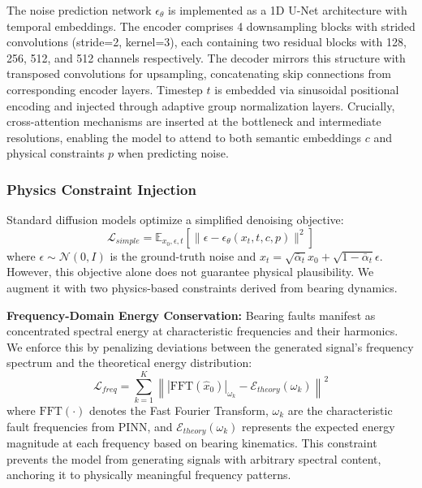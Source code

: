 \documentclass[journal]{IEEEtran}
\begin{document}
The noise prediction network $\epsilon_\theta$ is implemented as a 1D U-Net architecture with temporal embeddings. The encoder comprises 4 downsampling blocks with strided convolutions (stride=2, kernel=3), each containing two residual blocks with 128, 256, 512, and 512 channels respectively. The decoder mirrors this structure with transposed convolutions for upsampling, concatenating skip connections from corresponding encoder layers. Timestep $t$ is embedded via sinusoidal positional encoding and injected through adaptive group normalization layers. Crucially, cross-attention mechanisms are inserted at the bottleneck and intermediate resolutions, enabling the model to attend to both semantic embeddings $c$ and physical constraints $p$ when predicting noise.

\subsubsection{Physics Constraint Injection}
Standard diffusion models optimize a simplified denoising objective:
\begin{equation}
    \mathcal{L}_{simple} = \mathbb{E}_{x_0, \epsilon, t} \left[ \|\epsilon - \epsilon_\theta(x_t, t, c, p)\|^2 \right]
    \label{eq:ddpm_loss}
\end{equation}
where $\epsilon \sim \mathcal{N}(0, I)$ is the ground-truth noise and $x_t = \sqrt{\bar{\alpha}_t}x_0 + \sqrt{1-\bar{\alpha}_t}\epsilon$. However, this objective alone does not guarantee physical plausibility. We augment it with two physics-based constraints derived from bearing dynamics.

\textbf{Frequency-Domain Energy Conservation:} Bearing faults manifest as concentrated spectral energy at characteristic frequencies and their harmonics. We enforce this by penalizing deviations between the generated signal's frequency spectrum and the theoretical energy distribution:
\begin{equation}
    \mathcal{L}_{freq} = \sum_{k=1}^K \left\| |\text{FFT}(\hat{x}_0)|_{\omega_k} - \mathcal{E}_{theory}(\omega_k) \right\|^2
    \label{eq:freq_loss}
\end{equation}
where $\text{FFT}(\cdot)$ denotes the Fast Fourier Transform, $\omega_k$ are the characteristic fault frequencies from PINN, and $\mathcal{E}_{theory}(\omega_k)$ represents the expected energy magnitude at each frequency based on bearing kinematics. This constraint prevents the model from generating signals with arbitrary spectral content, anchoring it to physically meaningful frequency patterns.
\end{document}
